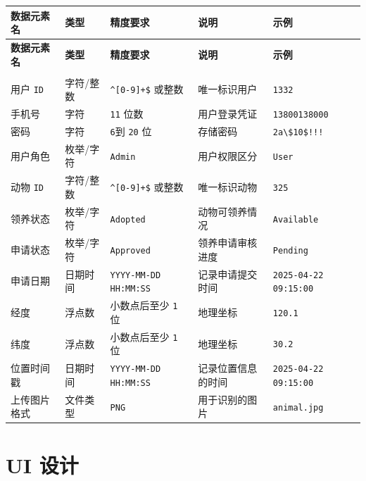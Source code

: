 \documentclass[12pt,a4paper,UTF8]{article}
\begin{document}
\begin{xltabular}{\linewidth}{
  |>{\raggedright\arraybackslash}m{3cm}
  |>{\raggedright\arraybackslash}m{2cm}
  |>{\raggedright\arraybackslash}m{4cm}
  |>{\raggedright\arraybackslash}m{3cm}
  |>{\raggedright\arraybackslash}m{3cm}|}
  \hline
  \textbf{数据元素名} & \textbf{类型} & \textbf{精度要求} & \textbf{说明} & \textbf{示例} \\ \hline \endfirsthead
  \hline
  \textbf{数据元素名} & \textbf{类型} & \textbf{精度要求} & \textbf{说明} & \textbf{示例} \\ \hline \endhead
  \hline
   \\ \endfoot
  \hline \endlastfoot

  用户 \verb|ID| & 字符/整数 & \verb|^[0-9]+$| 或整数 & 唯一标识用户 & \verb|1332| \\ \hline
  手机号 & 字符 & \verb|11| 位数 & 用户登录凭证 & \verb|13800138000| \\ \hline
  密码 & 字符 &  \verb|6|到 \verb|20| 位 & 存储密码 & \verb|2a\$10$!!!| \\ \hline
  用户角色 & 枚举/字符 & \verb|Admin| & 用户权限区分 & \verb|User| \\ \hline
  动物 \verb|ID| & 字符/整数 & \verb|^[0-9]+$| 或整数 & 唯一标识动物 & \verb|325| \\ \hline
  领养状态 & 枚举/字符 & \verb|Adopted| & 动物可领养情况 & \verb|Available| \\ \hline
  申请状态 & 枚举/字符 & \verb|Approved| & 领养申请审核进度 & \verb|Pending| \\ \hline
  申请日期 & 日期时间 & \verb|YYYY-MM-DD| \verb|HH:MM:SS| & 记录申请提交时间 & \verb|2025-04-22|  \verb|09:15:00| \\ \hline
  经度 & 浮点数 & 小数点后至少 \verb|1| 位 & 地理坐标 & \verb|120.1| \\ \hline
  纬度 & 浮点数 & 小数点后至少 \verb|1| 位 & 地理坐标 & \verb|30.2| \\ \hline
  位置时间戳 & 日期时间 & \verb|YYYY-MM-DD| \verb|HH:MM:SS| & 记录位置信息的时间 & \verb|2025-04-22|  \verb|09:15:00| \\ \hline
  上传图片格式 & 文件类型 & \verb|PNG| & 用于识别的图片 & \verb|animal.jpg| \\ \hline
\end{xltabular}

\section{UI 设计}
\end{document}
